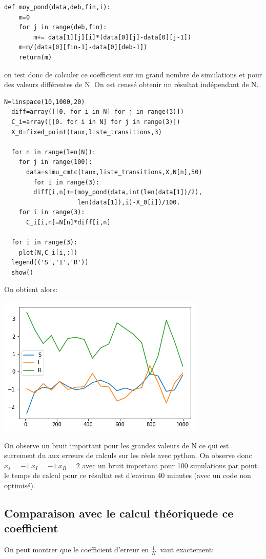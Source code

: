 \documentclass[a4paper]{article}
\begin{document}
\begin{lstlisting}[frame=single]
  def moy_pond(data,deb,fin,i):
    m=0
    for j in range(deb,fin):
        m+= data[1][j][i]*(data[0][j]-data[0][j-1])
    m=m/(data[0][fin-1]-data[0][deb-1])
    return(m)
\end{lstlisting}

on test donc de calculer ce coefficient sur un grand nombre de
simulations et pour des valeurs différentes de N. On est censsé
obtenir un résultat indépendant de N.
\newpage

\begin{lstlisting}[frame=single]
  N=linspace(10,1000,20)
  diff=array([[0. for i in N] for j in range(3)])
  C_i=array([[0. for i in N] for j in range(3)])
  X_0=fixed_point(taux,liste_transitions,3)

  for n in range(len(N)):
    for j in range(100):
      data=simu_cmtc(taux,liste_transitions,X,N[n],50)
        for i in range(3):
        diff[i,n]+=(moy_pond(data,int(len(data[1])/2),
                    len(data[1]),i)-X_0[i])/100.
    for i in range(3):
      C_i[i,n]=N[n]*diff[i,n]

  for i in range(3):
    plot(N,C_i[i,:])
  legend(('S','I','R'))
  show()
\end{lstlisting}

On obtient alors:

\includegraphics{figure3.png}

On observe un bruit important pour les grandes valeurs de N ce qui est
surrement du aux erreurs de calculs sur les réels avec python. On
observe donc $x_s=-1 \ x_I=-1\ x_R=2$ avec un bruit important pour 100
simulations par point. le temps de calcul pour ce résultat est
d'environ 40 minutes (avec un code non optimisé).

\newpage
\subsection{Comparaison avec le calcul théoriquede ce coefficient}
On peut montrer que le coefficient d'erreur en $\frac{1}{N} \ $ vaut
exactement: \cite{meanfieldaprox}
\end{document}
